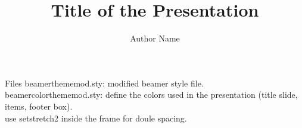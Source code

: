 \documentclass[10pt, aspectratio=169]{beamer}
\title[]{Title of the Presentation}
\author{Author Name}
\institute[]{\noindent
    Name of the Department\par
    Name of the Institute\par
}
\begin{document}
\bgroup
{} %
\maketitle
\egroup
\addtocounter{framenumber}{-1} %
\begin{frame}[t]{Files}
    beamerthememod.sty: modified beamer style file.\\
    beamercolorthememod.sty: define the colors used in the presentation (title slide, items, footer box).\\
    use setstretch{2} inside the frame for doule spacing.
\end{frame}
\end{document}

